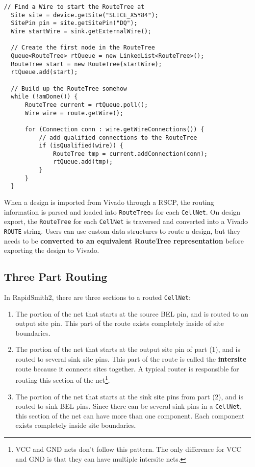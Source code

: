 \begin{lstlisting}[xleftmargin=1.5em, framexleftmargin=1.5em, caption=Building a
RouteTree, label=code:routeTree] 
  // Find a Wire to start the RouteTree at
  Site site = device.getSite("SLICE_X5Y84");
  SitePin pin = site.getSitePin("DQ");
  Wire startWire = sink.getExternalWire();

  // Create the first node in the RouteTree 
  Queue<RouteTree> rtQueue = new LinkedList<RouteTree>();
  RouteTree start = new RouteTree(startWire);
  rtQueue.add(start);

  // Build up the RouteTree somehow 
  while (!amDone()) {
	  RouteTree current = rtQueue.poll();
	  Wire wire = route.getWire();

	  for (Connection conn : wire.getWireConnections()) {
		  // add qualified connections to the RouteTree
		  if (isQualified(wire)) {
			  RouteTree tmp = current.addConnection(conn);
			  rtQueue.add(tmp);
		  }
	  }
  }
\end{lstlisting}

When a design is imported from Vivado through a RSCP, the routing information
is parsed and loaded into \texttt{Route\-Tree}s for each \texttt{CellNet}. On
design export, the \texttt{RouteTree} for each \texttt{CellNet} is traversed
and converted into a Vivado \texttt{ROUTE} string. Users can use custom data
structures to route a design, but they needs to be \textbf{converted to an
equivalent RouteTree representation} before exporting the design to Vivado.  

\subsection{Three Part Routing} \label{sec:threePartRouting}
In RapidSmith2, there are three sections to a routed \texttt{CellNet}: 

\begin{enumerate}
  \item The portion of the net that starts at the source BEL pin, and is routed
  to an output site pin. This part of the route exists completely inside of
  site boundaries.
  
  \item The portion of the net that starts at the output site pin of part (1),
  and is routed to several sink site pins. This part of the route is
  called the \textbf{intersite} route because it connects sites together. A
  typical router is responsible for routing this section of the
  net\footnote{VCC and GND nets don't follow this pattern. The only difference
  for VCC and GND is that they can have multiple intersite nets.}.
  
  \item The portion of the net that starts at the sink site pins from part (2),
  and is routed to sink BEL pins. Since there can be several sink pins in a
  \texttt{CellNet}, this section of the net can have more than one component.
  Each component exists completely inside site boundaries.
\end{enumerate}

